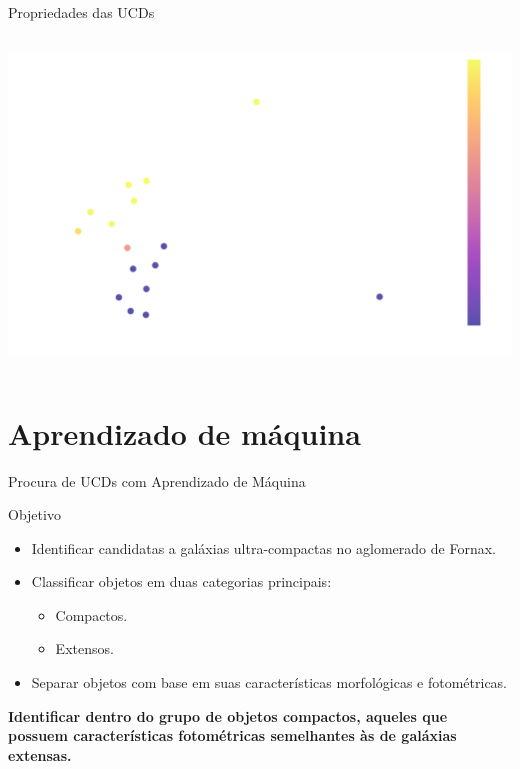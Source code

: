 \begin{frame}[c]{Propriedades das UCDs}
\begin{columns}[c]
\begin{column}{0.48\textwidth}
            \vspace{0.5cm}
            \includegraphics[width=\textwidth, height=0.48\textheight]{images/distribuicao_fwhm_image_r_r_aper6_ucds_fornax.png}
        \end{column}
    \end{columns}
\end{frame}

\section{Aprendizado de máquina}

\begin{frame}[c]{Procura de UCDs com Aprendizado de Máquina}
    \begin{splusbox}{Objetivo}
        \begin{itemize}
            \item Identificar candidatas a galáxias ultra-compactas no aglomerado de Fornax.
            \item Classificar objetos em duas categorias principais:
            \begin{itemize}
                \item Compactos.
                \item Extensos.
            \end{itemize}
            \item Separar objetos com base em suas características morfológicas e fotométricas.
        \end{itemize}
    \end{splusbox}
    \textbf{Identificar dentro do grupo de objetos compactos, aqueles que possuem características fotométricas semelhantes às de galáxias extensas.}
\end{frame}


